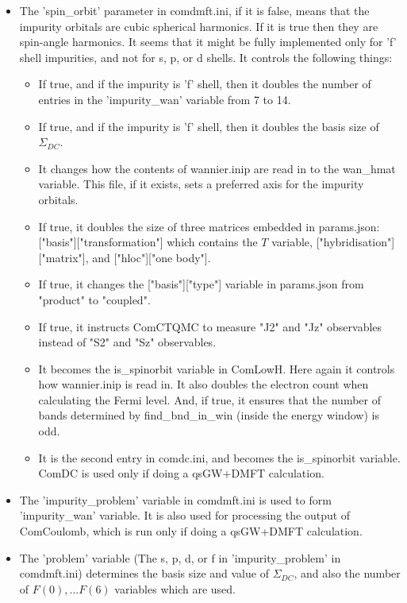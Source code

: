 \documentclass[aps,prb,singlecolumn,preprintnumbers,amsmath,amssymb]{revtex4}
\begin{document}
\begin{itemize}
\item The  'spin\_orbit' parameter in comdmft.ini, if it is false, means that the impurity orbitals are cubic spherical harmonics. If it is true then they are spin-angle harmonics.  It seems that it might be fully implemented only for 'f' shell impurities, and not for s, p, or d shells. It controls the following things:
\begin{itemize}
\item If true, and if the impurity is 'f' shell, then it doubles the number of entries in the 'impurity\_wan' variable from 7 to 14.
\item If true, and if the impurity is 'f' shell, then it doubles the basis size of $\Sigma_{DC}$.
\item It changes how the contents of wannier.inip are read in to the wan\_hmat variable.  This file, if it exists, sets a preferred axis for the impurity orbitals.
\item If true, it doubles the size of three matrices embedded in params.json:  ["basis"]["transformation"] which contains the $T$ variable, ["hybridisation"]["matrix"], and ["hloc"]["one body"].
\item If true, it changes the ["basis"]["type"] variable in params.json from "product" to "coupled".
\item If true, it instructs ComCTQMC to measure "J2" and "Jz" observables instead of "S2" and "Sz" observables.
\item It becomes the is\_spinorbit variable in ComLowH. Here again it controls how wannier.inip is read in. It also doubles the electron count when calculating the Fermi level. And, if true, it ensures that the number of bands determined by find\_bnd\_in\_win (inside the energy window)  is odd. 
\item It is the second entry in comdc.ini, and becomes the is\_spinorbit variable. ComDC is used only if doing a qsGW+DMFT calculation.
\end{itemize}
\item The 'impurity\_problem' variable in comdmft.ini is used to form 'impurity\_wan' variable. It is also used for processing the output of ComCoulomb, which is run only if doing a qsGW+DMFT calculation. %
\item  The 'problem' variable (The s, p, d, or f in 'impurity\_problem'  in comdmft.ini) determines the basis size and value of $\Sigma_{DC}$, and also the number of $F(0), ... F(6)$ variables which are used.

\end{itemize}
\end{document}
